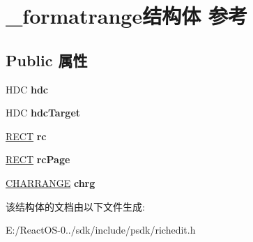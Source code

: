 \hypertarget{struct__formatrange}{}\section{\+\_\+formatrange结构体 参考}
\label{struct__formatrange}
\subsection*{Public 属性}
\begin{DoxyCompactItemize}
\item 
\mbox{\label{struct__formatrange_acf0f8fb40ae6d7e9040ecd41396bc95c}} 
H\+DC {\bfseries hdc}
\item 
\mbox{\label{struct__formatrange_a5fdeb208f24781d394e4693ce661829d}} 
H\+DC {\bfseries hdc\+Target}
\item 
\mbox{\label{struct__formatrange_a91bcf2d0712d459ec14cb9431dcd6828}} 
\hyperlink{structtag_r_e_c_t}{R\+E\+CT} {\bfseries rc}
\item 
\mbox{\label{struct__formatrange_ad379476c255f80d55e064e9b72389c52}} 
\hyperlink{structtag_r_e_c_t}{R\+E\+CT} {\bfseries rc\+Page}
\item 
\mbox{\label{struct__formatrange_a8318ebd8b20f8d54d88e37515106bc58}} 
\hyperlink{struct__charrange}{C\+H\+A\+R\+R\+A\+N\+GE} {\bfseries chrg}
\end{DoxyCompactItemize}


该结构体的文档由以下文件生成\+:\begin{DoxyCompactItemize}
\item 
E\+:/\+React\+O\+S-\/0../sdk/include/psdk/richedit.\+h\end{DoxyCompactItemize}
